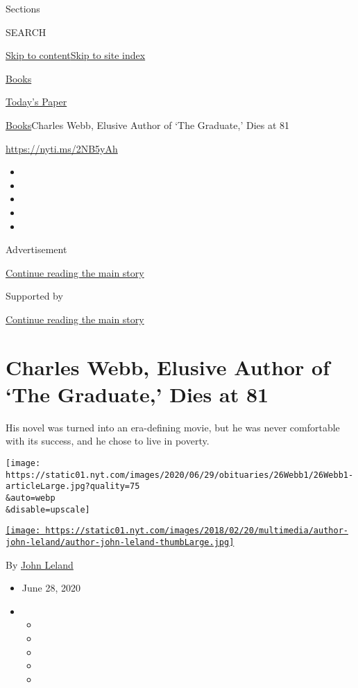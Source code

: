 Sections

SEARCH

\protect\hyperlink{site-content}{Skip to
content}\protect\hyperlink{site-index}{Skip to site index}

\href{https://www.nytimes.com/section/books}{Books}

\href{https://myaccount.nytimes.com/auth/login?response_type=cookie\&client_id=vi}{}

\href{https://www.nytimes.com/section/todayspaper}{Today's Paper}

\href{/section/books}{Books}\textbar{}Charles Webb, Elusive Author of
`The Graduate,' Dies at 81

\url{https://nyti.ms/2NB5yAh}

\begin{itemize}
\item
\item
\item
\item
\item
\end{itemize}

Advertisement

\protect\hyperlink{after-top}{Continue reading the main story}

Supported by

\protect\hyperlink{after-sponsor}{Continue reading the main story}

\hypertarget{charles-webb-elusive-author-of-the-graduate-dies-at-81}{%
\section{Charles Webb, Elusive Author of `The Graduate,' Dies at
81}\label{charles-webb-elusive-author-of-the-graduate-dies-at-81}}

His novel was turned into an era-defining movie, but he was never
comfortable with its success, and he chose to live in poverty.

\texttt{[image: https://static01.nyt.com/images/2020/06/29/obituaries/26Webb1/26Webb1-articleLarge.jpg?quality=75\\\&auto=webp\\\&disable=upscale]}

\href{https://www.nytimes.com/by/john-leland}{\texttt{[image: https://static01.nyt.com/images/2018/02/20/multimedia/author-john-leland/author-john-leland-thumbLarge.jpg]}}

By \href{https://www.nytimes.com/by/john-leland}{John Leland}

\begin{itemize}
\item
  June 28, 2020
\item
  \begin{itemize}
  \item
  \item
  \item
  \item
  \item
  \end{itemize}
\end{itemize}

